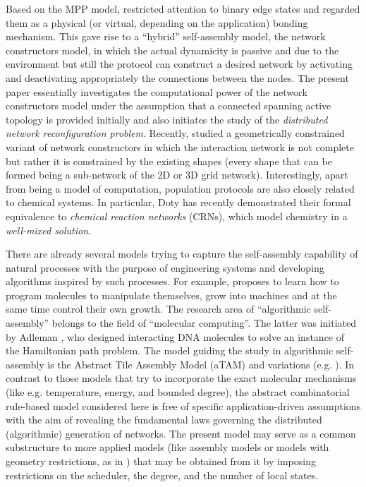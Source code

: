 \documentclass[preprint]{elsarticle}
\begin{document}
Based on the MPP model, \cite{MS14} restricted attention to binary edge states and regarded them as a physical (or virtual, depending on the application) bonding mechanism. This gave rise to a ``hybrid'' self-assembly model, the network constructors model, in which the actual dynamicity is passive and due to the environment but still the protocol can construct a desired network by activating and deactivating appropriately the connections between the nodes. The present paper essentially investigates the computational power of the network constructors model under the assumption that a connected spanning active topology is provided initially and also initiates the study of the \emph{distributed network reconfiguration problem}. Recently, \cite{Mi15} studied a geometrically constrained variant of network constructors in which the interaction network is not complete but rather it is constrained by the existing shapes (every shape that can be formed being a sub-network of the 2D or 3D grid network). Interestingly, apart from being a model of computation, population protocols are also closely related to chemical systems. In particular, Doty \cite{Do14} has recently demonstrated their formal equivalence to \emph{chemical reaction networks} (CRNs), which model chemistry in a \emph{well-mixed solution}.

There are already several models trying to capture the self-assembly capability of natural processes with the purpose of engineering systems and developing algorithms inspired by such processes. For example, \cite{Do12} proposes to learn how to program molecules to manipulate themselves, grow into machines and at the same time control their own growth. The research area of ``algorithmic self-assembly'' belongs to the field of ``molecular computing''. The latter was initiated by Adleman \cite{Ad94}, who designed interacting DNA molecules to solve an instance of the Hamiltonian path problem. The model guiding the study in algorithmic self-assembly is the Abstract Tile Assembly Model (aTAM) \cite{Wi98,RW00} and variations (e.g. \cite{FHPR15}). In contrast to those models that try to incorporate the exact molecular mechanisms (like e.g. temperature, energy, and bounded degree), the abstract combinatorial rule-based model considered here is free of specific application-driven assumptions with the aim of revealing the fundamental laws governing the distributed (algorithmic) generation of networks. The present model may serve as a common substructure to more applied models (like assembly models or models with geometry restrictions, as in \cite{Mi15}) that may be obtained from it by imposing restrictions on the scheduler, the degree, and the number of local states.
\end{document}
